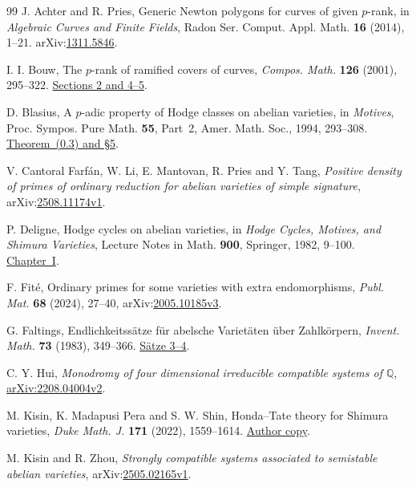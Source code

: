 \documentclass[11pt]{article}
\theoremstyle{definition}
\newcommand{\Q}{\mathbb Q}
\begin{document}
\begin{thebibliography}{99}
J. Achter and R. Pries, Generic Newton polygons for curves of given
\(p\)-rank, in \emph{Algebraic Curves and Finite Fields},
Radon Ser. Comput. Appl. Math. \textbf{16} (2014), 1--21.
arXiv:\href{https://arxiv.org/abs/1311.5846}{1311.5846}.

I. I. Bouw, The \(p\)-rank of ramified covers of curves,
\emph{Compos. Math.} \textbf{126} (2001), 295--322.
\href{https://doi.org/10.1023/A:1017513122376}{Sections 2 and 4--5}.

D. Blasius, A \(p\)-adic property of Hodge classes on abelian varieties,
in \emph{Motives}, Proc. Sympos. Pure Math. \textbf{55}, Part~2,
Amer. Math. Soc., 1994, 293--308.
\href{https://archive.mpim-bonn.mpg.de/id/eprint/3859/1/preprint_1992_59.pdf}{Theorem~(0.3) and \S5}.

V. Cantoral Farf\'an, W. Li, E. Mantovan, R. Pries and Y. Tang,
\emph{Positive density of primes of ordinary reduction for abelian
varieties of simple signature},
arXiv:\href{https://arxiv.org/abs/2508.11174v1}{2508.11174v1}.

P. Deligne, Hodge cycles on abelian varieties, in \emph{Hodge Cycles,
Motives, and Shimura Varieties}, Lecture Notes in Math. \textbf{900},
Springer, 1982, 9--100.
\href{https://www.jmilne.org/math/Documents/Deligne82.pdf}{Chapter~I}.

F. Fit\'e, Ordinary primes for some varieties with extra endomorphisms,
\emph{Publ. Mat.} \textbf{68} (2024), 27--40,
arXiv:\href{https://arxiv.org/abs/2005.10185v3}{2005.10185v3}.

G. Faltings, Endlichkeitss\"atze f\"ur abelsche Variet\"aten
\"uber Zahlk\"orpern, \emph{Invent. Math.} \textbf{73} (1983), 349--366.
\href{https://doi.org/10.1007/BF01388432}{S\"atze 3--4}.

{\raggedright C. Y. Hui, \emph{Monodromy of four dimensional irreducible
compatible systems of \(\Q\)},
\href{https://arxiv.org/abs/2208.04004v2}{arXiv:2208.04004v2}.\par}

M. Kisin, K. Madapusi Pera and S. W. Shin,
Honda--Tate theory for Shimura varieties,
\emph{Duke Math. J.} \textbf{171} (2022), 1559--1614.
\href{https://people.math.harvard.edu/~kisin/dvifiles/newton2.pdf}{Author copy}.

M. Kisin and R. Zhou, \emph{Strongly compatible systems associated
to semistable abelian varieties},
arXiv:\href{https://arxiv.org/abs/2505.02165v1}{2505.02165v1}.


\end{thebibliography}
\end{document}
